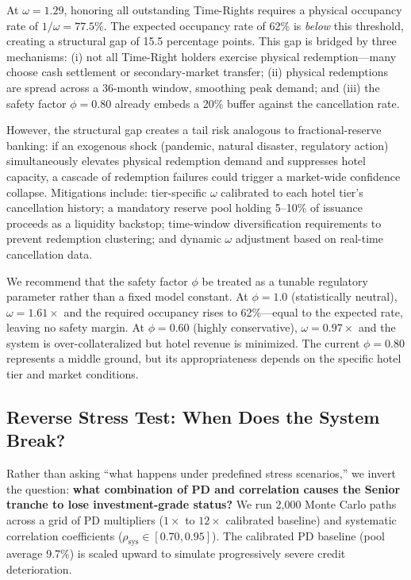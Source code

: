 \documentclass[12pt,a4paper]{article}
\begin{document}
At $\omega = 1.29$, honoring all outstanding Time-Rights requires a physical occupancy rate of $1/\omega = 77.5\%$.
The expected occupancy rate of 62\% is \emph{below} this threshold, creating a structural gap of 15.5 percentage points.
This gap is bridged by three mechanisms: (i) not all Time-Right holders exercise physical redemption---many choose cash settlement or secondary-market transfer; (ii) physical redemptions are spread across a 36-month window, smoothing peak demand; and (iii) the safety factor $\phi = 0.80$ already embeds a 20\% buffer against the cancellation rate.

However, the structural gap creates a tail risk analogous to fractional-reserve banking: if an exogenous shock (pandemic, natural disaster, regulatory action) simultaneously elevates physical redemption demand and suppresses hotel capacity, a cascade of redemption failures could trigger a market-wide confidence collapse.
Mitigations include: tier-specific $\omega$ calibrated to each hotel tier's cancellation history; a mandatory reserve pool holding 5--10\% of issuance proceeds as a liquidity backstop; time-window diversification requirements to prevent redemption clustering; and dynamic $\omega$ adjustment based on real-time cancellation data.

We recommend that the safety factor $\phi$ be treated as a tunable regulatory parameter rather than a fixed model constant.
At $\phi = 1.0$ (statistically neutral), $\omega = 1.61\times$ and the required occupancy rises to 62\%---equal to the expected rate, leaving no safety margin.
At $\phi = 0.60$ (highly conservative), $\omega = 0.97\times$ and the system is over-collateralized but hotel revenue is minimized.
The current $\phi = 0.80$ represents a middle ground, but its appropriateness depends on the specific hotel tier and market conditions.

\subsection{Reverse Stress Test: When Does the System Break?}

Rather than asking ``what happens under predefined stress scenarios,'' we invert the question: \textbf{what combination of PD and correlation causes the Senior tranche to lose investment-grade status?}
We run 2,000 Monte Carlo paths across a grid of PD multipliers ($1\times$ to $12\times$ calibrated baseline) and systematic correlation coefficients ($\rho_{\text{sys}} \in [0.70, 0.95]$).
The calibrated PD baseline (pool average 9.7\%) is scaled upward to simulate progressively severe credit deterioration.
\end{document}
